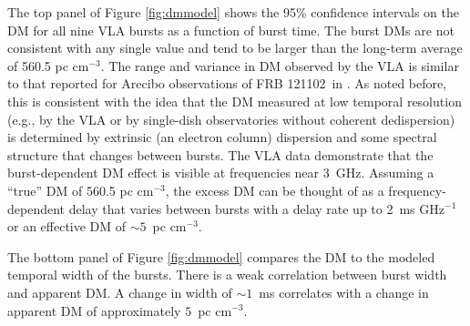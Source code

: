 \documentclass[twocolumn]{aastex61}
\newcommand{\frb}{FRB 121102}
\begin{document}
The top panel of Figure \ref{fig:dmmodel} shows the 95\% confidence intervals on the DM for all nine VLA bursts as a function of burst time. The burst DMs are not consistent with any single value and tend to be larger than the long-term average of 560.5 pc cm$^{-3}$. The range and variance in DM observed by the VLA is similar to that reported for Arecibo observations of \frb\ in \citet{2016arXiv160308880S}. As noted before, this is consistent with the idea that the DM measured at low temporal resolution (e.g., by the VLA or by single-dish observatories without coherent dedispersion) is determined by extrinsic (an electron column) dispersion and some spectral structure that changes between bursts. The VLA data demonstrate that the burst-dependent DM effect is visible at frequencies near 3~GHz. Assuming a ``true'' DM of 560.5 pc cm$^{-3}$, the excess DM can be thought of as a frequency-dependent delay that varies between bursts with a delay rate up to 2~ms GHz$^{-1}$ or an effective DM of $\sim5$~pc cm$^{-3}$.

The bottom panel of Figure \ref{fig:dmmodel} compares the DM to the modeled temporal width of the bursts. There is a weak correlation between burst width and apparent DM. A change in width of $\sim1$~ms correlates with a change in apparent DM of approximately $5$~pc cm$^{-3}$.
\end{document}
